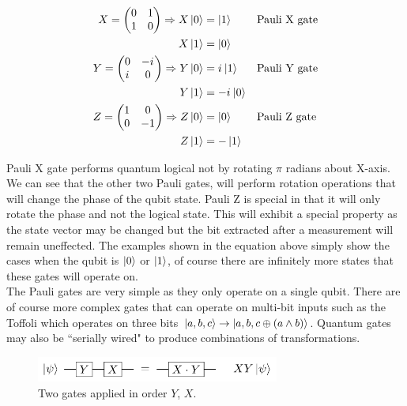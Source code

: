\documentclass[conference]{IEEEtran}
\newcommand{\iu}{{i\mkern1mu}}
\begin{document}
\begin{align*}
X = \begin{pmatrix}
	0 & 1\\
	1 & 0
\end{pmatrix} \Rightarrow X \ket{0} &= \ket{1} && \text{Pauli X gate}\\
X\ket{1} &= \ket{0}\\
Y = \begin{pmatrix}
	0 & -\iu\\
	\iu & 0
\end{pmatrix} \Rightarrow Y \ket{0} &= \iu\ket{1} && \text{Pauli Y gate}\\
Y\ket{1} &= -\iu\ket{0}\\
Z = \begin{pmatrix}
	1 & 0\\
	0 & -1
\end{pmatrix} \Rightarrow Z \ket{0} &= \ket{0} && \text{Pauli Z gate}\\
Z\ket{1} &= -\ket{1}
\end{align*}

Pauli X gate performs quantum logical not by rotating $\pi$ radians about X-axis. We can see that the other two Pauli gates, will perform rotation operations that will change the phase of the qubit state. Pauli Z is special in that it will only rotate the phase and not the logical state. This will exhibit a special property as the state vector may be changed but the bit extracted after a measurement will remain uneffected. The examples shown in the equation above simply show the cases when the qubit is $\ket{0}$ or $\ket{1}$, of course there are infinitely more states that these gates will operate on.\cite{b5}\\

The Pauli gates are very simple as they only operate on a single qubit. There are of course more complex gates that can operate on multi-bit inputs such as the Toffoli which operates on three bits $\ket{a,b,c} \rightarrow\ket{a,b,c \oplus (a \land b)}$. Quantum gates may also be ``serially wired" to produce combinations of transformations.

\begin{figure}[htbp]
\centerline{\includegraphics[width=8cm]{serially_pauli_xy.png}}
\caption{Two gates applied in order $Y$, $X$.}
\label{serial_pauli}
\end{figure}
\end{document}
